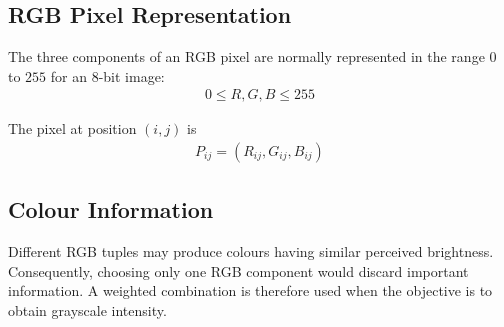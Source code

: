\subsection{RGB Pixel Representation}

The three components of an RGB pixel are normally represented in the
range $0$ to $255$ for an 8-bit image:
\begin{align}
0\leq R,G,B\leq255\label{eq:rgb_range}
\end{align}

The pixel at position $(i,j)$ is
\begin{align}
P_{ij}=(R_{ij},G_{ij},B_{ij})\label{eq:rgb_tuple}
\end{align}
\vspace*{\baselineskip}
\subsection{Colour Information}

Different RGB tuples may produce colours having similar perceived
brightness. Consequently, choosing only one RGB component would discard
important information. A weighted combination is therefore used when
the objective is to obtain grayscale intensity.
